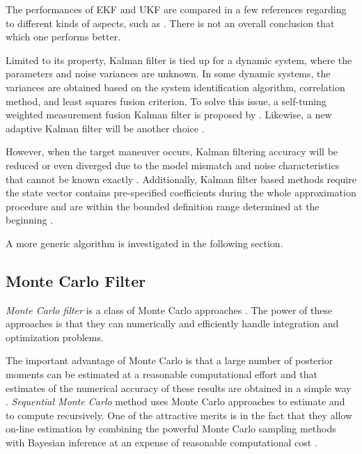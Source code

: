 The performances of EKF and UKF are compared in a few references regarding to different kinds of aspects, such as \citep{chandrasekar2007comparison, laviola2003comparison, st2004comparison}. There is not an overall conclusion that which one performs better. 


Limited to its property, Kalman filter is tied up for a dynamic system, where the parameters and noise variances are unknown. In some dynamic systems, the variances are obtained based on the system identification algorithm, correlation method, and least squares fusion criterion. To solve this issue, a self-tuning weighted measurement fusion Kalman filter is proposed by \cite{ran2010self}. Likewise, a new adaptive Kalman filter will be another choice \citep{oussalah2001adaptive}. 


However, when the target maneuver occurs, Kalman filtering accuracy will be reduced or even diverged due to the model mismatch and noise characteristics that cannot be known exactly \citep{liu2014filtering}. Additionally, Kalman filter based methods require the state vector contains pre-specified coefficients during the whole approximation procedure and are within the bounded definition range determined at the beginning \citep{jauch2017recursive}. 

A more generic algorithm is investigated in the following section. 

\subsection*{Monte Carlo Filter}

\textit{Monte Carlo filter} is a class of Monte Carlo approaches \citep{chen2003bayesian}. The power of these approaches is that they can numerically and efficiently handle integration and optimization problems. 

The important advantage of Monte Carlo is that a large number of posterior moments can be estimated at a reasonable computational effort and that estimates of the numerical accuracy of these results are obtained in a simple way \citep{kloek1978bayesian}. \textit{Sequential Monte Carlo} method uses Monte Carlo approaches to estimate and to compute recursively. One of the attractive merits is in the fact that they allow on-line estimation by combining the powerful Monte Carlo sampling methods with Bayesian inference at an expense of reasonable computational cost \citep{chen2003bayesian}. 

